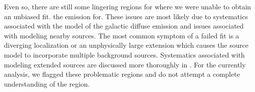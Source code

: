 Even so, there are still some lingering regions for where we were unable
to obtain an unbiased fit.  the emission for.  These issues are most
likely due to systematics associated with the model of the galactic
diffuse emission and issues associated with modeling nearby sources.
The most common symptom of a failed fit is a diverging localization
or an unphysically large extension which causes the source model
to incorporate multiple background sources. Systematics associated
with modeling extended sources are discussed more thoroughly in
\citep{LAT_collaboration_extended_search_2012}.  For the currently
analysis, we flagged these problematic regions 
and do not attempt a complete understanding of the region.
